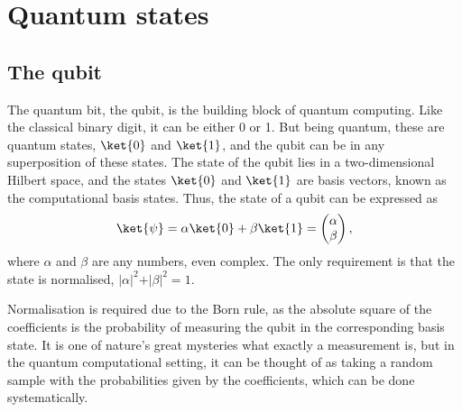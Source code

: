 \section{Quantum states}
\subsection{The qubit}
The quantum bit, the qubit, is the building block of quantum computing.
Like the classical binary digit, it can be either 0 or 1.
But being quantum, these are quantum states, $\ket{0}$ and $\ket{1}$\footnotemark{}, and the qubit can be in any superposition of these states.
The state of the qubit lies in a two-dimensional Hilbert space, and the states $\ket{0}$ and $\ket{1}$ are basis vectors, known as the computational basis states.
Thus, the state of a qubit can be expressed as
\begin{equation}
    \ket{\psi} = \alpha \ket{0} + \beta \ket{1} = \begin{pmatrix} \alpha \\ \beta \end{pmatrix},
    \label{eq:qubit}
\end{equation}
where $\alpha$ and $\beta$ are any numbers, even complex.
The only requirement is that the state is normalised, $\vert\alpha\vert^2 + \vert\beta\vert^2 = 1$.


Normalisation is required due to the Born rule, as the absolute square of the coefficients is the probability of measuring the qubit in the corresponding basis state.
It is one of nature's great mysteries what exactly a measurement is, but in the quantum computational setting, it can be thought of as taking a random sample with the probabilities given by the coefficients, which can be done systematically.

